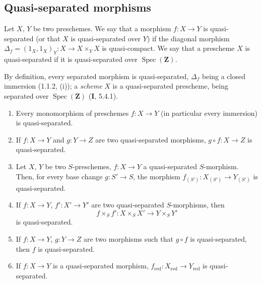 \subsection{Quasi-separated morphisms}
\label{subsection:IV.1.2}

\begin{definition}[1.2.1]
\label{IV.1.2.1}
Let $X$, $Y$ be two preschemes. We say that a morphism $f:X\to Y$ is
quasi-separated \textup{(or that} $X$ is quasi-separated over $Y$\textup{)} if
the diagonal morphism
$\Delta_f=(1_X,1_X)_Y:X\to X\times_Y X$ is quasi-compact. We say that a
prescheme $X$ is quasi-separated if it is quasi-separated over
$\operatorname{Spec}(\mathbf Z)$.
\end{definition}

By definition, every separated morphism is quasi-separated, $\Delta_f$ being a
closed immersion (1.1.2, (i)); a \emph{scheme} $X$ is a quasi-separated
prescheme, being separated over $\operatorname{Spec}(\mathbf Z)$ (\textbf{I}, 5.4.1).

\begin{proposition}[1.2.2]
\label{IV.1.2.2}
\begin{enumerate}
  \item[\textup{(i)}] Every monomorphism of preschemes $f:X\to Y$ (in particular every
  immersion) is quasi-separated.
  \item[\textup{(ii)}] If $f:X\to Y$ and $g:Y\to Z$ are two quasi-separated morphisms,
  $g\circ f:X\to Z$ is quasi-separated.
  \item[\textup{(iii)}] Let $X$, $Y$ be two $S$-preschemes, $f:X\to Y$ a quasi-separated
  $S$-morphism. Then, for every base change $g:S'\to S$, the morphism
  $f_{(S')}:X_{(S')}\to Y_{(S')}$ is quasi-separated.
  \item[\textup{(iv)}] If $f:X\to Y$, $f':X'\to Y'$ are two quasi-separated $S$-morphisms,
  then
  \[
    f\times_S f':X\times_S X'\to Y\times_S Y'
  \]
  is quasi-separated.
  \item[\textup{(v)}] If $f:X\to Y$, $g:Y\to Z$ are two morphisms such that $g\circ f$
  is quasi-separated, then $f$ is quasi-separated.
  \item[\textup{(vi)}] If $f:X\to Y$ is a quasi-separated morphism,
  $f_{\mathrm{red}}:X_{\mathrm{red}}\to Y_{\mathrm{red}}$ is quasi-separated.
\end{enumerate}
\end{proposition}


